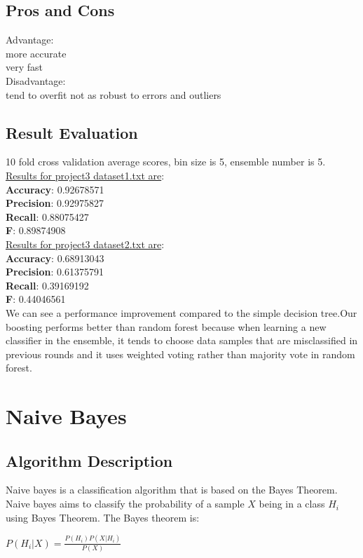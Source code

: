 \documentclass[paper=letter, fontsize=11pt]{article}
\numberwithin{equation}{section}		%
\numberwithin{figure}{section}			%
\numberwithin{table}{section}				%
\begin{document}
\subsection{Pros and Cons}
Advantage:\\
more accurate\\
very fast\\
\noindent Disadvantage:\\
tend to overfit
not as robust to errors and outliers
\subsection{Result Evaluation}
10 fold  cross validation average scores, bin size is 5, ensemble number is 5.
\\
\noindent \underline{ Results for project3 dataset1.txt are}: \\ 
\textbf{Accuracy}: 0.92678571\\
\textbf{Precision}: 0.92975827\\
\textbf{Recall}: 0.88075427\\
\textbf{F}: 0.89874908\\

\noindent \underline{ Results for project3 dataset2.txt are}: \\ 
\textbf{Accuracy}: 0.68913043\\
\textbf{Precision}: 0.61375791\\
\textbf{Recall}: 0.39169192\\
\textbf{F}: 0.44046561\\

We can see a performance improvement compared to the simple decision tree.Our boosting performs better than random forest because when learning a new classifier in the ensemble, it tends to choose data samples that are misclassified in previous rounds and it uses weighted voting rather than majority vote in random forest.\\
\section{Naive Bayes}
\subsection{Algorithm Description}
Naive bayes is a classification algorithm that is based on the Bayes Theorem. Naive bayes aims to classify the probability of a sample $X$ being in a class $H_i$ using Bayes Theorem. The Bayes theorem is:\\
\begin{center} $P(H_i|X) = \frac{P(H_i)P(X|H_i)}{P(X)}$ \end{center}
\end{document}
